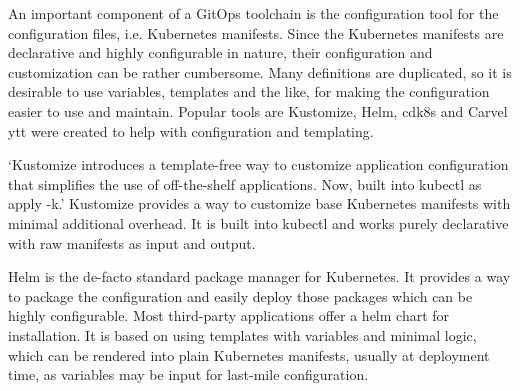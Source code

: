 


An important component of a GitOps toolchain is the configuration tool
for the configuration files, i.e. Kubernetes manifests.
Since the Kubernetes manifests are declarative and highly configurable in nature,
their configuration and customization can be rather cumbersome.
Many definitions are duplicated, so it is desirable to use variables, templates and the like,
for making the configuration easier to use and maintain.
Popular tools are Kustomize, Helm, cdk8s and Carvel ytt were created to help with configuration and templating.

\enquote*{Kustomize introduces a template-free way to customize application configuration that simplifies the use of off-the-shelf applications. Now, built into kubectl as apply -k.}
\autocite{kustomizeIoWebsite}
Kustomize provides a way to customize base Kubernetes manifests with minimal additional overhead.
It is built into kubectl and works purely declarative with raw manifests as input and output.

Helm is the de-facto standard package manager for Kubernetes.
It provides a way to package the configuration and easily deploy those packages
which can be highly configurable.
Most third-party applications offer a helm chart for installation.
It is based on using templates with variables and minimal logic,
which can be rendered into plain Kubernetes manifests, usually at deployment time,
as variables may be input for last-mile configuration.

%









